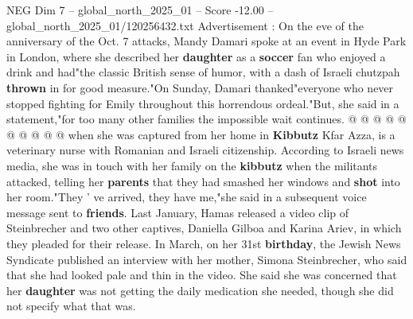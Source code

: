 \begin{textsample}{NEG Dim 7 – global\_north\_2025\_01 – Score -12.00 – global\_north\_2025\_01/120256432.txt}
Advertisement : On the eve of the anniversary of the Oct. 7 attacks, Mandy Damari spoke at an event in Hyde Park in London, where she described her \textbf{daughter} as a \textbf{soccer} fan who enjoyed a drink and had"the classic British sense of humor, with a dash of Israeli chutzpah \textbf{thrown} in for good measure."On Sunday, Damari thanked"everyone who never stopped fighting for Emily throughout this horrendous ordeal."But, she said in a statement,"for too many other families the impossible wait continues. @ @ @ @ @ @ @ @ @ @ when she was captured from her home in \textbf{Kibbutz} Kfar Azza, is a veterinary nurse with Romanian and Israeli citizenship.
According to Israeli news media, she was in touch with her family on the \textbf{kibbutz} when the militants attacked, telling her \textbf{parents} that they had smashed her windows and \textbf{shot} into her room."They ' ve arrived, they have me,"she said in a subsequent voice message sent to \textbf{friends}.
Last January, Hamas released a video clip of Steinbrecher and two other captives, Daniella Gilboa and Karina Ariev, in which they pleaded for their release.
In March, on her 31st \textbf{birthday}, the Jewish News Syndicate published an interview with her mother, Simona Steinbrecher, who said that she had looked pale and thin in the video.
She said she was concerned that her \textbf{daughter} was not getting the daily medication she needed, though she did not specify what that was.

\end{textsample}
